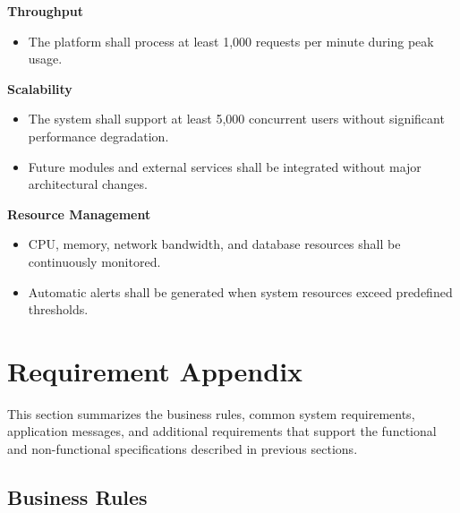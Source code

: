 \textbf{Throughput}

\begin{itemize}
    \item The platform shall process at least 1,000 requests per minute during peak usage.
\end{itemize}

\textbf{Scalability}

\begin{itemize}
    \item The system shall support at least 5,000 concurrent users without significant performance degradation.
    \item Future modules and external services shall be integrated without major architectural changes.
\end{itemize}

\textbf{Resource Management}

\begin{itemize}
    \item CPU, memory, network bandwidth, and database resources shall be continuously monitored.
    \item Automatic alerts shall be generated when system resources exceed predefined thresholds.
\end{itemize}

\section{Requirement Appendix}

This section summarizes the business rules, common system requirements,
application messages, and additional requirements that support the
functional and non-functional specifications described in previous sections.

\subsection{Business Rules}

